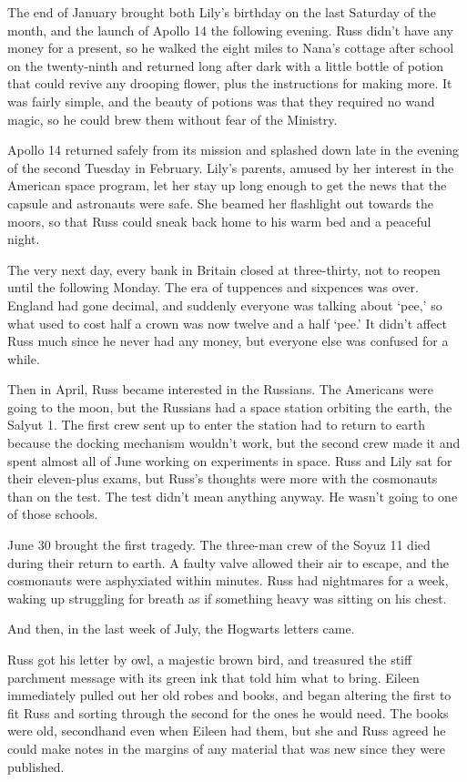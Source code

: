 The end of January brought both Lily's birthday on the last Saturday of the month, and the launch of Apollo 14 the following evening. Russ didn't have any money for a present, so he walked the eight miles to Nana's cottage after school on the twenty-ninth and returned long after dark with a little bottle of potion that could revive any drooping flower, plus the instructions for making more. It was fairly simple, and the beauty of potions was that they required no wand magic, so he could brew them without fear of the Ministry.

Apollo 14 returned safely from its mission and splashed down late in the evening of the second Tuesday in February. Lily's parents, amused by her interest in the American space program, let her stay up long enough to get the news that the capsule and astronauts were safe. She beamed her flashlight out towards the moors, so that Russ could sneak back home to his warm bed and a peaceful night.

The very next day, every bank in Britain closed at three-thirty, not to reopen until the following Monday. The era of tuppences and sixpences was over. England had gone decimal, and suddenly everyone was talking about `pee,' so what used to cost half a crown was now twelve and a half `pee.' It didn't affect Russ much since he never had any money, but everyone else was confused for a while.

Then in April, Russ became interested in the Russians. The Americans were going to the moon, but the Russians had a space station orbiting the earth, the Salyut 1. The first crew sent up to enter the station had to return to earth because the docking mechanism wouldn't work, but the second crew made it and spent almost all of June working on experiments in space. Russ and Lily sat for their eleven-plus exams, but Russ's thoughts were more with the cosmonauts than on the test. The test didn't mean anything anyway. He wasn't going to one of those schools.

June 30 brought the first tragedy. The three-man crew of the Soyuz 11 died during their return to earth. A faulty valve allowed their air to escape, and the cosmonauts were asphyxiated within minutes. Russ had nightmares for a week, waking up struggling for breath as if something heavy was sitting on his chest.

And then, in the last week of July, the Hogwarts letters came.

Russ got his letter by owl, a majestic brown bird, and treasured the stiff parchment message with its green ink that told him what to bring. Eileen immediately pulled out her old robes and books, and began altering the first to fit Russ and sorting through the second for the ones he would need. The books were old, secondhand even when Eileen had them, but she and Russ agreed he could make notes in the margins of any material that was new since they were published.

